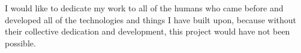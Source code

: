 I would like to dedicate my work to all of the humans who came before
and developed all of the technologies and things I have built upon,
because without their collective dedication and development, this
project would have not been possible.

